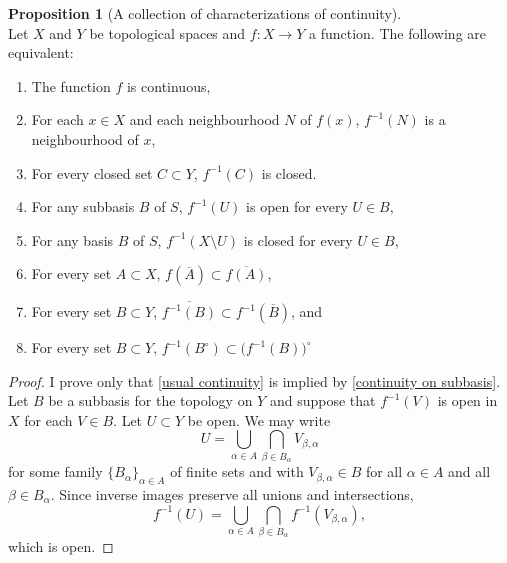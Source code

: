 \documentclass{book}
\theoremstyle{definition}
\newtheorem{proposition}{Proposition}[section]
\theoremstyle{remark}
\begin{document}
\begin{proposition}[A collection of characterizations of continuity]\label{continuity characterisations}$ $\\
Let $X$ and $Y$ be topological spaces and $f:X\to Y$ a function. The following are equivalent:
\begin{enumerate}
    \item\label{usual continuity} The function $f$ is continuous,
    \item For each $x\in X$ and each neighbourhood $N$ of $f(x)$, $f^{-1}(N)$ is a neighbourhood of $x$,
    \item For every closed set $C\subset Y$, $f^{-1}(C)$ is closed.
    \item\label{continuity on subbasis} For any subbasis $B$ of $S$, $f^{-1}(U)$ is open for every $U\in B$,
    \item For any basis $B$ of $S$, $f^{-1}(X\setminus U)$ is closed for every $U\in B$,
    \item For every set $A\subset X$, $f(\overline A)\subset\overline{f(A)}$,
    \item For every set $B\subset Y$, $\overline{f^{-1}(B)}\subset f^{-1}(\overline B)$, and
    \item For every set $B\subset Y$, $f^{-1}(B^\circ)\subset\big(f^{-1}(B)\big)^\circ$
\end{enumerate}
\end{proposition}
\begin{proof} I prove only that \eqref{usual continuity} is implied by \eqref{continuity on subbasis}. Let $B$ be a subbasis for the topology on $Y$ and suppose that $f^{-1}(V)$ is open in $X$ for each $V\in B$. Let $U\subset Y$ be open. We may write
    $$U=\bigcup_{\alpha\in A} \bigcap_{\beta\in B_\alpha} V_{\beta,\alpha}$$
for some family $\{ B_\alpha\}_{\alpha\in A}$ of finite sets and with $V_{\beta,\alpha}\in B$ for all $\alpha\in A$ and all $\beta\in B_\alpha$. Since inverse images preserve all unions and intersections,
    $$f^{-1}(U)=\bigcup_{\alpha\in A} \bigcap_{\beta\in B_\alpha} f^{-1}(V_{\beta,\alpha}),$$
which is open.
\end{proof}
\end{document}
